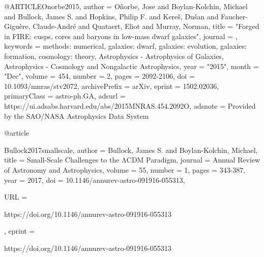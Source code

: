 \documentclass[apj]{emulateapj}
\begin{document}
{{{{@ARTICLE{Onorbe2015,
       author = {{O{\~n}orbe}, Jose and {Boylan-Kolchin}, Michael and
         {Bullock}, James S. and {Hopkins}, Philip F. and
         {Kere{\v{s}}}, Du{\v{s}}an and {Faucher-Gigu{\`e}re}, Claude-Andr{\'e} and
         {Quataert}, Eliot and {Murray}, Norman},
        title = "{Forged in FIRE: cusps, cores and baryons in low-mass dwarf galaxies}",
      journal = {\mnras},
     keywords = {methods: numerical, galaxies: dwarf, galaxies: evolution, galaxies: formation, cosmology: theory, Astrophysics - Astrophysics of Galaxies, Astrophysics - Cosmology and Nongalactic Astrophysics},
         year = "2015",
        month = "Dec",
       volume = {454},
       number = {2},
        pages = {2092-2106},
          doi = {10.1093/mnras/stv2072},
archivePrefix = {arXiv},
       eprint = {1502.02036},
 primaryClass = {astro-ph.GA},
       adsurl = {https://ui.adsabs.harvard.edu/abs/2015MNRAS.454.2092O},
      adsnote = {Provided by the SAO/NASA Astrophysics Data System}
}






@article{Bullock2017smallscale,
author = {Bullock, James S. and Boylan-Kolchin, Michael},
title = {Small-Scale Challenges to the ΛCDM Paradigm},
journal = {Annual Review of Astronomy and Astrophysics},
volume = {55},
number = {1},
pages = {343-387},
year = {2017},
doi = {10.1146/annurev-astro-091916-055313},

URL = { 
        https://doi.org/10.1146/annurev-astro-091916-055313
    
},
eprint = { 
        https://doi.org/10.1146/annurev-astro-091916-055313
    
}}}}}}
\end{document}

